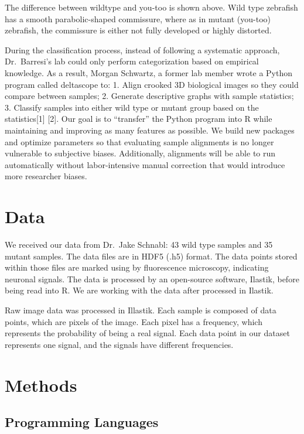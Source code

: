 \documentclass[10pt,letterpaper]{article}
\begin{document}
The difference between wildtype and you-too is shown above. Wild type
zebrafish has a smooth parabolic-shaped commissure, where as in mutant
(you-too) zebrafish, the commissure is either not fully developed or
highly distorted.

During the classification process, instead of following a systematic
approach, Dr.~Barresi's lab could only perform categorization based on
empirical knowledge. As a result, Morgan Schwartz, a former lab member
wrote a Python program called deltascope to: 1. Align crooked 3D
biological images so they could compare between samples; 2. Generate
descriptive graphs with sample statistics; 3. Classify samples into
either wild type or mutant group based on the statistics{[}1{]} {[}2{]}.
Our goal is to ``transfer'' the Python program into R while maintaining
and improving as many features as possible. We build new packages and
optimize parameters so that evaluating sample alignments is no longer
vulnerable to subjective biases. Additionally, alignments will be able
to run automatically without labor-intensive manual correction that
would introduce more researcher biases.

\section{Data}\label{data}

We received our data from Dr.~Jake Schnabl: 43 wild type samples and 35
mutant samples. The data files are in HDF5 (.h5) format. The data points
stored within those files are marked using by fluorescence microscopy,
indicating neuronal signals. The data is processed by an open-source
software, Ilastik, before being read into R. We are working with the
data after processed in Ilastik.

Raw image data was processed in Illastik. Each sample is composed of
data points, which are pixels of the image. Each pixel has a frequency,
which represents the probability of being a real signal. Each data point
in our dataset represents one signal, and the signals have different
frequencies.

\section{Methods}\label{methods}

\subsection{Programming Languages}\label{programming-languages}
\end{document}
